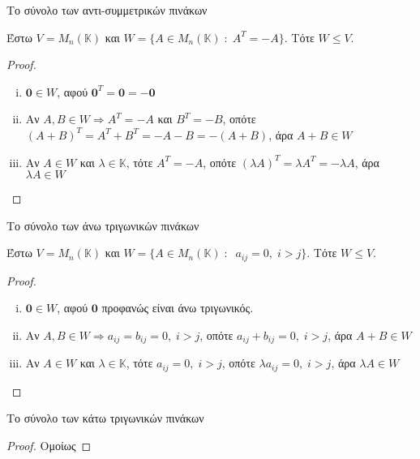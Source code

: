 \begin{example}
  \textcolor{Col2}{Το σύνολο των αντι-συμμετρικών πινάκων}

  Έστω $ V = M_{n}(\mathbb{K}) $ και $ W = \{ A \in M_{n}(\mathbb{K}) \;
  : \; A^{T}=-A \}  $. Τότε $ W \leq V $.
  \begin{proof}
  \item {}
    \begin{enumerate}[i)]
      \item  $ \mathbf{0} \in W $, αφού $ \mathbf{0}^{T}= 
        \mathbf{0} = - \mathbf{0} $
      \item 
        Αν $ A, B \in W \Rightarrow A^{T}=-A $ και $ B^{T}=-B $, οπότε
        $ (A+B)^{T}= A^{T}+B^{T}=-A-B = - (A+B) $, άρα $A+B \in W$
      \item Αν $ A \in W $ και $ \lambda \in \mathbb{K} $, τότε 
        $A^{T}=-A$, οπότε $(\lambda A)^{T} = \lambda A^{T} =
        -\lambda A  $, άρα $ \lambda A \in W $
    \end{enumerate}
  \end{proof}
\end{example}

\begin{example}
  \textcolor{Col2}{Το σύνολο των άνω τριγωνικών πινάκων}

  Έστω $ V = M_{n}(\mathbb{K}) $ και $ W = \{ A \in M_{n}(\mathbb{K}) \;
  : \; \; a_{ij} = 0, \; i>j \}  $. Τότε $ W \leq V $.

  \begin{proof}
  \item {}
    \begin{enumerate}[i)]
      \item  $ \mathbf{0} \in W $, αφού $ \mathbf{0} $ 
        προφανώς είναι άνω τριγωνικός.
      \item  Αν $ A, B \in W \Rightarrow a_{ij} = b_{ij} = 0, 
        \; i>j$, οπότε $a_{ij} + b_{ij} = 0, \; i>j$, άρα $A+B \in W$
      \item Αν $ A \in W $ και $ \lambda \in \mathbb{K} $, τότε 
        $a_{ij} = 0, \; i>j$, οπότε $ \lambda a_{ij} = 0, \; i>j$, 
        άρα $ \lambda A \in W $
    \end{enumerate}
  \end{proof}
\end{example}

\begin{example}
  \textcolor{Col2}{Το σύνολο των κάτω τριγωνικών πινάκων}
  \begin{proof}
    Ομοίως
  \end{proof}
\end{example}

